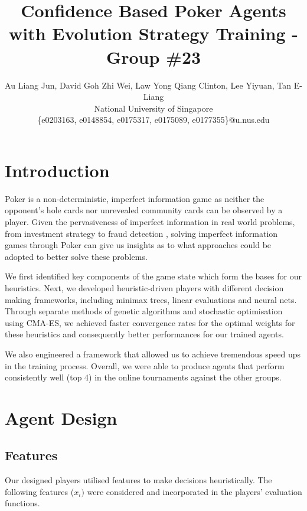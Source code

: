 \documentclass{article}
\title{Confidence Based Poker Agents with Evolution Strategy Training - Group \#23}
\author{
Au Liang Jun, David Goh Zhi Wei, Law Yong Qiang Clinton, Lee Yiyuan, Tan E-Liang
\\ 
National University of Singapore
\\
\{e0203163, e0148854, e0175317, e0175089, e0177355\}@u.nus.edu
}
\begin{document}
\maketitle

\section{Introduction}
Poker is a non-deterministic, imperfect information game as neither the opponent's hole cards nor unrevealed community cards can be observed by a player. Given the pervasiveness of imperfect information in real world problems, from investment strategy to fraud detection \cite{brown2017libratus}, solving imperfect information games through Poker can give us insights as to what approaches could be adopted to better solve these problems.

We first identified key components of the game state which form the bases for our heuristics. Next, we developed heuristic-driven players with different decision making frameworks, including minimax trees, linear evaluations and neural nets. Through separate methods of genetic algorithms and stochastic optimisation using CMA-ES, we achieved faster convergence rates for the optimal weights for these heuristics and consequently better performances for our trained agents.

We also engineered a framework that allowed us to achieve tremendous speed ups in the training process. Overall, we were able to produce agents that perform consistently well (top 4) in the online tournaments against the other groups.

\section{Agent Design}
\subsection{Features}

Our designed players utilised features to make decisions heuristically. The following features (\(x_i)\) were considered and incorporated in the players' evaluation functions.
\end{document}
